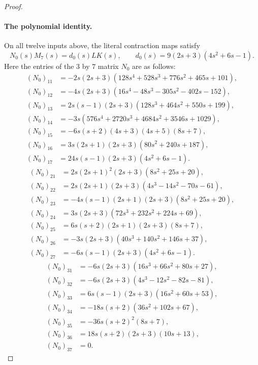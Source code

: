 \documentclass[11pt]{article}
\theoremstyle{definition}\newtheorem{definition}[theorem]{Definition}
\begin{document}
\begin{proof}
\paragraph{The polynomial identity.}
On all twelve inputs above, the literal contraction maps
satisfy
\begin{equation}\label{eq:geometric-polynomial-identity}
 N_0(s)M_7(s)=d_0(s)LK(s),\qquad
 d_0(s)=9(2s+3)(4s^2+6s-1).
\end{equation}
Here the entries of the $3$ by $7$ matrix $N_0$ are as follows:
\begin{align*}
(N_0)_{11}&=-2s(2s+3)(128s^4+528s^3+776s^2+465s+101),\\
(N_0)_{12}&=-4s(2s+3)(16s^4-48s^3-305s^2-402s-152),\\
(N_0)_{13}&=2s(s-1)(2s+3)(128s^3+464s^2+550s+199),\\
(N_0)_{14}&=-3s(576s^4+2720s^3+4684s^2+3546s+1029),\\
(N_0)_{15}&=-6s(s+2)(4s+3)(4s+5)(8s+7),\\
(N_0)_{16}&=3s(2s+1)(2s+3)(80s^2+240s+187),\\
(N_0)_{17}&=24s(s-1)(2s+3)(4s^2+6s-1).
\end{align*}
\begin{align*}
(N_0)_{21}&=2s(2s+1)^2(2s+3)(8s^2+25s+20),\\
(N_0)_{22}&=2s(2s+1)(2s+3)(4s^3-14s^2-70s-61),\\
(N_0)_{23}&=-4s(s-1)(2s+1)(2s+3)(8s^2+25s+20),\\
(N_0)_{24}&=3s(2s+3)(72s^3+232s^2+224s+69),\\
(N_0)_{25}&=6s(s+2)(2s+1)(2s+3)(8s+7),\\
(N_0)_{26}&=-3s(2s+3)(40s^3+140s^2+146s+37),\\
(N_0)_{27}&=-6s(s-1)(2s+3)(4s^2+6s-1).
\end{align*}
\begin{align*}
(N_0)_{31}&=-6s(2s+3)(16s^3+66s^2+80s+27),\\
(N_0)_{32}&=-6s(2s+3)(4s^3-12s^2-82s-81),\\
(N_0)_{33}&=6s(s-1)(2s+3)(16s^2+60s+53),\\
(N_0)_{34}&=-18s(s+2)(36s^2+102s+67),\\
(N_0)_{35}&=-36s(s+2)^2(8s+7),\\
(N_0)_{36}&=18s(s+2)(2s+3)(10s+13),\\
(N_0)_{37}&=0.
\end{align*}


\end{proof}
\end{document}
